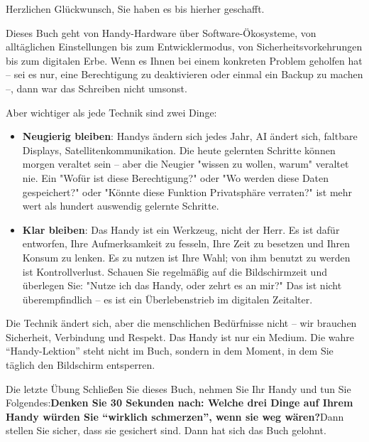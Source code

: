
Herzlichen Glückwunsch, Sie haben es bis hierher geschafft.

Dieses Buch geht von Handy-Hardware über Software-Ökosysteme, von alltäglichen Einstellungen bis zum Entwicklermodus, von Sicherheitsvorkehrungen bis zum digitalen Erbe. Wenn es Ihnen bei einem konkreten Problem geholfen hat – sei es nur, eine Berechtigung zu deaktivieren oder einmal ein Backup zu machen –, dann war das Schreiben nicht umsonst.

Aber wichtiger als jede Technik sind zwei Dinge:

\begin{itemize}
  \item \textbf{Neugierig bleiben}: Handys ändern sich jedes Jahr, AI ändert sich, faltbare Displays, Satellitenkommunikation. Die heute gelernten Schritte können morgen veraltet sein – aber die Neugier "wissen zu wollen, warum" veraltet nie. Ein "Wofür ist diese Berechtigung?" oder "Wo werden diese Daten gespeichert?" oder "Könnte diese Funktion Privatsphäre verraten?" ist mehr wert als hundert auswendig gelernte Schritte.
  \item \textbf{Klar bleiben}: Das Handy ist ein Werkzeug, nicht der Herr. Es ist dafür entworfen, Ihre Aufmerksamkeit zu fesseln, Ihre Zeit zu besetzen und Ihren Konsum zu lenken. Es zu nutzen ist Ihre Wahl; von ihm benutzt zu werden ist Kontrollverlust. Schauen Sie regelmäßig auf die Bildschirmzeit und überlegen Sie: "Nutze ich das Handy, oder zehrt es an mir?" Das ist nicht überempfindlich – es ist ein Überlebenstrieb im digitalen Zeitalter.
\end{itemize}

Die Technik ändert sich, aber die menschlichen Bedürfnisse nicht – wir brauchen Sicherheit, Verbindung und Respekt. Das Handy ist nur ein Medium. Die wahre “Handy-Lektion” steht nicht im Buch, sondern in dem Moment, in dem Sie täglich den Bildschirm entsperren.

\begin{tcbpractice}{Die letzte Übung}
Schließen Sie dieses Buch, nehmen Sie Ihr Handy und tun Sie Folgendes:\textbf{Denken Sie 30 Sekunden nach: Welche drei Dinge auf Ihrem Handy würden Sie “wirklich schmerzen”, wenn sie weg wären?}Dann stellen Sie sicher, dass sie gesichert sind. Dann hat sich das Buch gelohnt.

\end{tcbpractice}
